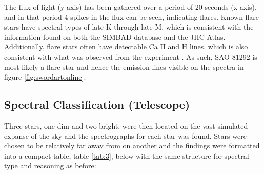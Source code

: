 \documentclass[12pt]{article}
\begin{document}
The flux of light (y-axis) has been gathered over a period of 20 seconds (x-axis), and in that period 4 spikes in the flux can be seen, indicating
flares. Known flare stars have spectral types of late-K through late-M, which is consistent with the information found on both the SIMBAD database and the JHC Atlas.
Additionally, flare stars often have detectable Ca II and H lines, which is also consistent with what was observed from the experiment \cite{aavso}.
As such, SAO 81292 is most likely a flare star and hence the emission lines visible on the spectra in figure \ref{fig:swordartonline}.

\subsection{Spectral Classification (Telescope)}

Three stars, one dim and two bright, were then located on the vast simulated expanse of the sky and the spectrographs for each star was found. Stars were chosen to be relatively far away from
on another and the findings were formatted into a compact table, table \ref{tab:3}, below with the same structure for spectral type and reasoning as before:
\end{document}
